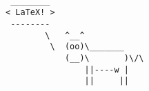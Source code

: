 \documentclass{article}
\begin{document}
\begin{verbatim}

 ________
< LaTeX! >
 --------
        \   ^__^
         \  (oo)\_______
            (__)\       )\/\
                ||----w |
                ||     ||
\end{verbatim}
\end{document}
